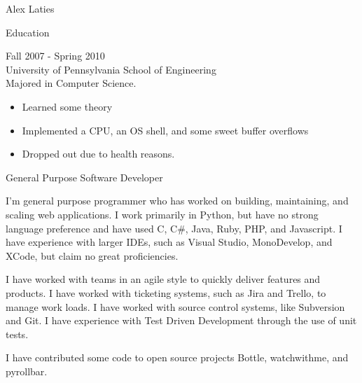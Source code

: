 \documentclass[a4paper]{article}
\begin{document}
    \begin{multicols}{2}
        \begin{LARGE}
        \noindent
        Alex Laties\\
        \end{LARGE}
        \columnbreak

        \begin{Large}
        \noindent
        Education\\
        \end{Large}
        \begingroup
        \fontsize{8pt}{12pt}\selectfont
        \noindent
        Fall 2007 - Spring 2010 \\
        University of Pennsylvania School of Engineering \\
        Majored in Computer Science.
        \begin{itemize}
            \item Learned some theory 
            \item Implemented a CPU, an OS shell, and some sweet buffer overflows 
            \item Dropped out due to health reasons.
        \end{itemize}
        \endgroup
    \end{multicols}
    

    \begin{Large}
        \noindent
        General Purpose Software Developer \\
    \end{Large}

    \begingroup
        \fontsize{8pt}{12pt}\selectfont
        \noindent
        I'm general purpose programmer who has worked on building, maintaining, and scaling web applications. I work primarily in Python, but have no strong language preference and have used C, C\#, Java, Ruby, PHP, and Javascript.  I have experience with larger IDEs, such as Visual Studio, MonoDevelop, and XCode, but claim no great proficiencies. \\
        \par
        \noindent
        I have worked with teams in an agile style to quickly deliver features and products. I have worked with ticketing systems, such as Jira and Trello, to manage work loads. I have worked with source control systems, like Subversion and Git. I have experience with Test Driven Development through the use of unit tests. \\
        \par
        \noindent
        I have contributed some code to open source projects Bottle, watchwithme, and pyrollbar.\\
    \endgroup
\end{document}
